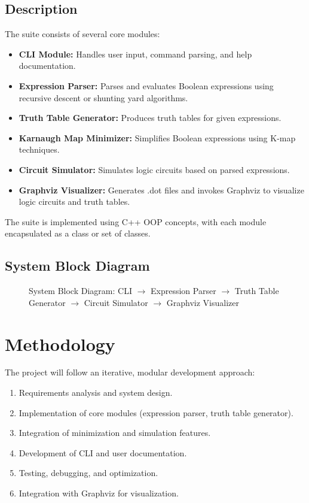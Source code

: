 \documentclass[a4paper,12pt]{article}
\begin{document}
\subsection{Description}
The suite consists of several core modules:
\begin{itemize}
    \item \textbf{CLI Module:} Handles user input, command parsing, and help documentation.
    \item \textbf{Expression Parser:} Parses and evaluates Boolean expressions using recursive descent or shunting yard algorithms.
    \item \textbf{Truth Table Generator:} Produces truth tables for given expressions.
    \item \textbf{Karnaugh Map Minimizer:} Simplifies Boolean expressions using K-map techniques.
    \item \textbf{Circuit Simulator:} Simulates logic circuits based on parsed expressions.
    \item \textbf{Graphviz Visualizer:} Generates .dot files and invokes Graphviz to visualize logic circuits and truth tables.
\end{itemize}
The suite is implemented using C++ OOP concepts, with each module encapsulated as a class or set of classes.

\subsection{System Block Diagram}
\begin{figure}[ht!]
    \centering
    \caption{System Block Diagram: CLI $\rightarrow$ Expression Parser $\rightarrow$ Truth Table Generator $\rightarrow$ Circuit Simulator $\rightarrow$ Graphviz Visualizer}
\end{figure}

\section{Methodology}
The project will follow an iterative, modular development approach:
\begin{enumerate}
    \item Requirements analysis and system design.
    \item Implementation of core modules (expression parser, truth table generator).
    \item Integration of minimization and simulation features.
    \item Development of CLI and user documentation.
    \item Testing, debugging, and optimization.
    \item Integration with Graphviz for visualization.
\end{enumerate}
\end{document}
